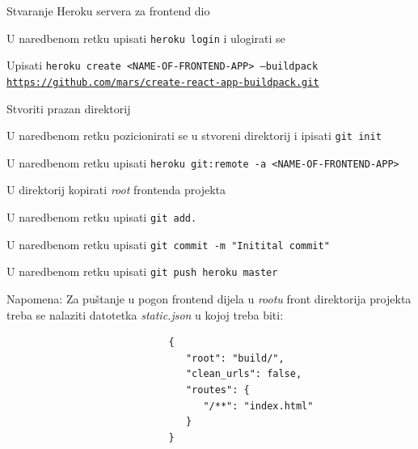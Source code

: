					\begin{packed_item}
					\item Stvaranje Heroku servera za frontend dio
					\begin{packed_enum}
						\item U naredbenom retku upisati \texttt{heroku login} i ulogirati se
						\item Upisati \texttt{heroku create <NAME-OF-FRONTEND-APP> --buildpack \url{https://github.com/mars/create-react-app-buildpack.git}}
						\item Stvoriti prazan direktorij
						\item U naredbenom retku pozicionirati se u stvoreni direktorij i ipisati \texttt{git init}
						\item U naredbenom retku upisati \texttt{heroku git:remote -a <NAME-OF-FRONTEND-APP>}
						\item U direktorij kopirati \textit{root} frontenda projekta
						\item U naredbenom retku upisati \texttt{git add.}
						\item U naredbenom retku upisati \texttt{git commit -m "Initital commit"}
						\item U naredbenom retku upisati \texttt{git push heroku master}
					\end{packed_enum}
					\begin{packed_item}
						\item Napomena: Za puštanje u pogon frontend dijela u \textit{rootu} front direktorija projekta treba se nalaziti datotetka \textit{static.json} u kojoj treba biti: \begin{verbatim}
							{
							   "root": "build/",
							   "clean_urls": false,
							   "routes": {
							      "/**": "index.html"
							   }
							}
						\end{verbatim}
					\end{packed_item}
				\end{packed_item}
			\eject 
